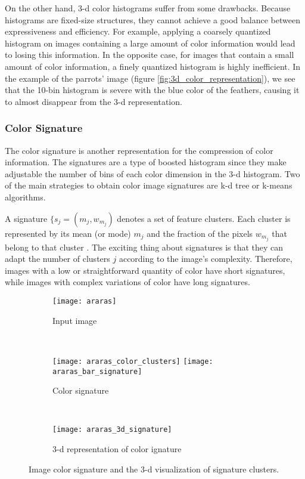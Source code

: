 On the other hand, 3-d color histograms suffer from some drawbacks. Because histograms are fixed-size structures, they cannot achieve a good balance between expressiveness and efficiency. For example, applying a coarsely quantized histogram on images containing a large amount of color information would lead to losing this information. In the opposite case, for images that contain a small amount of color information, a finely quantized histogram is highly inefficient. In the example of the parrots' image (figure \ref{fig:3d_color_representation}), we see that the 10-bin histogram is severe with the blue color of the feathers, causing it to almost disappear from the 3-d representation.

\subsubsection{Color Signature}

The color signature is another representation for the compression of color information. The signatures are a type of boosted histogram since they make adjustable the number of bins of each color dimension in the 3-d histogram. Two of the main strategies to obtain color image signatures are k-d tree or k-means algorithms.

A signature $\{s_j = (m_j, w_{m_j})$ denotes a set of feature clusters. Each cluster is represented by its mean (or mode) $m_j$ and the fraction of the pixels $w_{m_j}$ that belong to that cluster \citep{Rubner.Tomasi:Book:2001}. The exciting thing about signatures is that they can adapt the number of clusters $j$ according to the image's complexity. Therefore, images with a low or straightforward quantity of color have short signatures, while images with complex variations of color have long signatures.

\begin{figure}[!ht]
    \centering
    \begin{subfigure}[b]{0.25\textwidth}
        \texttt{[image: araras]}
        \caption{Input image}
    \end{subfigure} \\
    
    \begin{subfigure}[b]{0.4\textwidth}
    	\texttt{[image: araras\_color\_clusters]}
        \texttt{[image: araras\_bar\_signature]}
        \caption{Color signature}
    \end{subfigure}
    	~ %
    \begin{subfigure}[b]{0.5\textwidth}
        \texttt{[image: araras\_3d\_signature]}
        \caption{3-d representation of color ignature}
    \end{subfigure} 
    	    
    \caption{Image color signature and the 3-d visualization of signature clusters.}\label{fig:color_signature}    
\end{figure}

